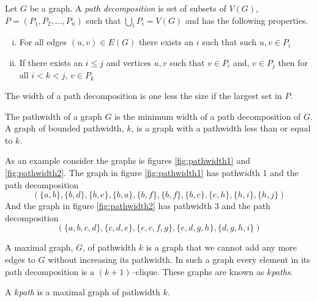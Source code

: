 \begin{definition}
    Let $G$ be a graph. A \textit{path decomposition} is set of subsets of $V(G)$, $P=(P_1,P_2,\dots,P_n)$ such that $\bigcup_{i} P_i=V(G)$ and has the following properties.    
    \begin{enumerate}[(i)]
        \item For all edges $(u,v) \in E(G)$ there exists an $i$ such that such $u,v\in P_i$
        \item If there exists an $i\leq j$ and vertices $u,v$ such that $v\in P_i$ and, $v\in P_j$ then for all $i<k<j$, $v\in P_k$
    \end{enumerate}
    The width of a path decomposition is one less the size if the largest set in $P$.
\end{definition}

\begin{definition}[Pathwidth]
    The pathwidth of a graph $G$ is the minimum width of a path decomposition of $G$.    
    A graph of bounded pathwidth, $k$, is a graph with a pathwidth less than or equal to $k$. 
\end{definition}

As an example consider the graphs is figures \ref{fig:pathwidth1} and \ref{fig:pathwidth2}. The graph in figure \ref{fig:pathwidth1} has pathwidth 1 and the path decomposition
\[(\{a,b\},\{b,d\},\{b,e\},\{b,a\},\{b,f\},\{b,f\},\{b,c\},\{c,h\},\{h,i\},\{h,j\})\]
And the graph in figure \ref{fig:pathwidth2} has pathwidth 3 and the path decomposition 
\[(\{a,b,c,d\},\{c,d,e\},\{e,c,f,g\},\{e,d,g,h\},\{d,g,h,i\})\] 

A maximal graph, $G$, of pathwidth $k$ is a graph that we cannot add any more edges to $G$ without increasing its pathwidth. In such a graph every element in its path decomposition is a $(k+1)$--clique. These graphs are known as \textit{$k$paths}.
\begin{definition}[$k$path]
    A \textit{$k$path} is a maximal graph of pathwidth $k$.
\end{definition}


